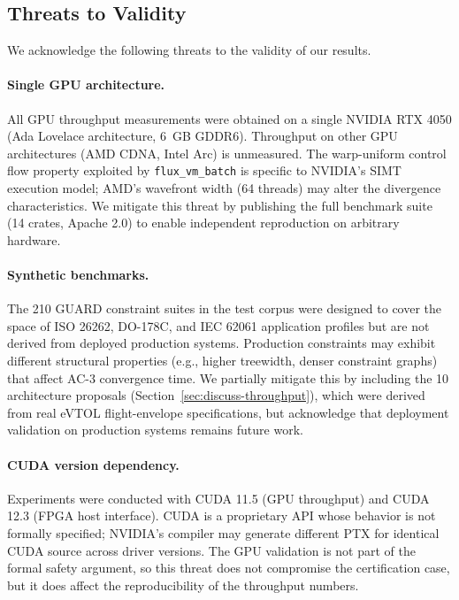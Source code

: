 \documentclass[sigplan,review,anonymous]{acmart}
\begin{document}
{%
\subsection{Threats to Validity}
\label{sec:discuss-threats}

We acknowledge the following threats to the validity of our results.

\paragraph{Single GPU architecture.}
All GPU throughput measurements were obtained on a single NVIDIA RTX 4050
(Ada Lovelace architecture, 6~GB GDDR6). Throughput on other GPU
architectures (AMD CDNA, Intel Arc) is unmeasured. The warp-uniform
control flow property exploited by \texttt{flux\_vm\_batch} is specific
to NVIDIA's SIMT execution model; AMD's wavefront width (64 threads)
may alter the divergence characteristics. We mitigate this threat by
publishing the full benchmark suite (14 crates, Apache 2.0) to enable
independent reproduction on arbitrary hardware.

\paragraph{Synthetic benchmarks.}
The 210 GUARD constraint suites in the test corpus were designed to cover
the space of ISO 26262, DO-178C, and IEC 62061 application profiles but
are not derived from deployed production systems. Production constraints
may exhibit different structural properties (e.g., higher treewidth,
denser constraint graphs) that affect AC-3 convergence time. We
partially mitigate this by including the 10 architecture proposals
(Section~\ref{sec:discuss-throughput}), which were derived from real
eVTOL flight-envelope specifications, but acknowledge that deployment
validation on production systems remains future work.

\paragraph{CUDA version dependency.}
Experiments were conducted with CUDA 11.5 (GPU throughput) and CUDA 12.3
(FPGA host interface). CUDA is a proprietary API whose behavior is not
formally specified; NVIDIA's compiler may generate different PTX for
identical CUDA source across driver versions. The GPU validation is not
part of the formal safety argument, so this threat does not compromise
the certification case, but it does affect the reproducibility of the
throughput numbers.

}
\end{document}
